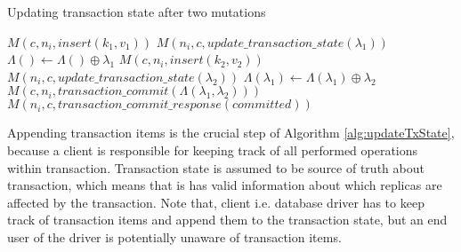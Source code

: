 \begin{algorithm}
  \caption{Updating transaction state after two mutations}
  \label{alg:updateTxState}
  \begin{algorithmic}       
    \State \beginTransactionMessage
    \State \initialTxStateMessage
    \State $\mathit{M}(c, n_{i}, \mathit{insert(k_{1},v_{1})})$
    \State $\mathit{M}(n_{i}, c, \mathit{update\_transaction\_state}(\lambda_{1}))$
    \State $\Lambda() \gets \Lambda() \oplus \lambda_{1}$
    \State $\mathit{M}(c, n_{i}, \mathit{insert(k_{2},v_{2})})$
    \State $\mathit{M}(n_{i}, c, \mathit{update\_transaction\_state}(\lambda_{2}))$
    \State $\Lambda(\lambda_{1}) \gets \Lambda(\lambda_{1}) \oplus \lambda_{2}$
    \State $\mathit{M}(c, n_{i}, \mathit{transaction\_commit}(\Lambda(\lambda_{1}, \lambda_{2})))$
    \State $\mathit{M}(n_{i}, c, \mathit{transaction\_commit\_response}(committed))$    
  \end{algorithmic}
\end{algorithm}


Appending transaction items is the crucial step of Algorithm \ref{alg:updateTxState}, because a client is responsible for keeping track of all performed operations within transaction. Transaction state is assumed to be source of truth about transaction, which means that is has valid information about which replicas are affected by the transaction.
Note that, client i.e. database driver has to keep track of transaction items and append them to the transaction state, but an end user of the driver is potentially unaware of transaction items.

